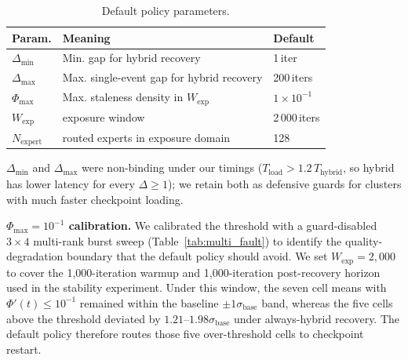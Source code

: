 \documentclass[10pt,conference]{IEEEtran}
\begin{document}
\begin{table}[!b]
\caption{Default policy parameters.}
\label{tab:policy}
\setlength{\tabcolsep}{4pt}
\renewcommand{\arraystretch}{1.1}
\begin{center}
\begin{tabular}{@{}l p{} l@{}}
\toprule
\textbf{Param.} & \textbf{Meaning} & \textbf{Default} \\
\midrule
$\Delta_{\min}$    & Min. gap for hybrid recovery                         & 1\,iter           \\
$\Delta_{\max}$    & Max. single-event gap for hybrid recovery            & 200\,iters        \\
$\Phi_{\max}$      & Max. staleness density in $W_{\mathrm{exp}}$          & $1\!\times\!10^{-1}$ \\
$W_{\mathrm{exp}}$ & exposure window                                       & 2\,000\,iters     \\
$N_{\text{expert}}$ & routed experts in exposure domain                    & 128               \\
\bottomrule
\end{tabular}
\end{center}
\end{table}

$\Delta_{\min}$ and $\Delta_{\max}$ were non-binding under our timings ($T_{\text{load}}>1.2\,T_{\text{hybrid}}$, so hybrid has lower latency for every $\Delta\!\geq\!1$); we retain both as defensive guards for clusters with much faster checkpoint loading.

\textbf{$\Phi_{\max}=10^{-1}$ calibration.} We calibrated the threshold with a guard-disabled $3\!\times\!4$ multi-rank burst sweep (Table~\ref{tab:multi_fault}) to identify the quality-degradation boundary that the default policy should avoid. We set $W_{\mathrm{exp}}=2{,}000$ to cover the 1{,}000-iteration warmup and 1{,}000-iteration post-recovery horizon used in the stability experiment. Under this window, the seven cell means with $\Phi'(t)\!\leq\!10^{-1}$ remained within the baseline $\pm 1\sigma_{\text{base}}$ band, whereas the five cells above the threshold deviated by $1.21$--$1.98\sigma_{\text{base}}$ under always-hybrid recovery. The default policy therefore routes those five over-threshold cells to checkpoint restart.
\end{document}
